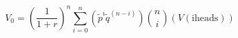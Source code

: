 \documentclass[11pt]{article}
\begin{document}
\[
V_0 = (\frac{1}{1+r})^n
\sum_{i=0}^{n}(\tilde{p}^i\tilde{q}^{(n-i)})
{n \choose i}
(V(\mathrm{iheads}))
\]
\end{document}
